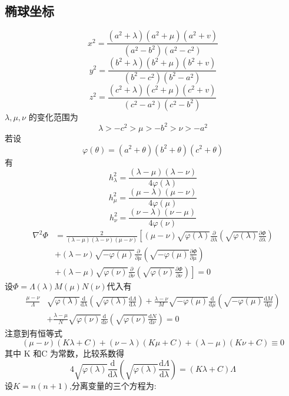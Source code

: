\documentclass[a4paper]{ctexart}
\begin{document}
\subsection{椭球坐标}
\[
    x^{2}=\frac{\left(a^{2}+\lambda\right)\left(a^{2}+\mu\right)\left(a^{2}+v\right)}{\left(a^{2}-b^{2}\right)\left(a^{2}-c^{2}\right)}
\]
\[
    y^{2}=\frac{\left(b^{2}+\lambda\right)\left(b^{2}+\mu\right)\left(b^{2}+v\right)}{\left(b^{2}-c^{2}\right)\left(b^{2}-a^{2}\right)}
\]
\[
    z^{2}=\frac{\left(c^{2}+\lambda\right)\left(c^{2}+\mu\right)\left(c^{2}+v\right)}{\left(c^{2}-a^{2}\right)\left(c^{2}-b^{2}\right)}
\]
$\lambda, \mu, \nu$ 的变化范围为
\[
    \lambda>-c^{2}>\mu>-b^{2}>\nu>-a^{2}
\]
若设
\[
    \varphi(\theta)=\left(a^{2}+\theta\right)\left(b^{2}+\theta\right)\left(c^{2}+\theta\right)
\]
有
\[
    h_{\lambda}^{2}=\frac{(\lambda-\mu)(\lambda-\nu)}{4 \varphi(\lambda)}
\]
\[
    h_{\mu}^{2}=\frac{(\mu-\lambda)(\mu-\nu)}{4 \varphi(\mu)}
\]
\[
    h_{\nu}^{2}=\frac{(\nu-\lambda)(\nu-\mu)}{4 \varphi(\nu)}
\]
\[
    \begin{aligned}
        \nabla^{2} \Phi
         & =\frac{2}{(\lambda-\mu)(\lambda-\nu)(\mu-\nu)}\left[(\mu-\nu) \sqrt{\varphi(\lambda)} \frac{\partial}{\partial \lambda}\left(\sqrt{\varphi(\lambda)} \frac{\partial \Phi}{\partial \lambda}\right)\right. \\
         & +(\lambda-\nu) \sqrt{-\varphi(\mu)} \frac{\partial}{\partial \mu}\left(\sqrt{-\varphi(\mu)} \frac{\partial \Phi}{\partial \mu}\right)                                                                     \\
         & +\left.(\lambda-\mu) \sqrt{\varphi(\nu)} \frac{\partial}{\partial \nu}\left(\sqrt{\varphi(\nu)} \frac{\partial \Phi}{\partial \nu}\right)\right]=0
    \end{aligned}
\]
设$\Phi=\Lambda(\lambda) M(\mu) N(\nu)$代入有
\[
    \begin{aligned}
        \frac{\mu-\nu}{\Lambda}
         & \sqrt{\varphi(\lambda)} \frac{\mathrm{d}}{\mathrm{d} \lambda}\left(\sqrt{\varphi(\lambda)} \frac{\mathrm{d} \Lambda}{\mathrm{d} \lambda}\right)+\frac{\lambda-\nu}{M} \sqrt{-\varphi(\mu)} \frac{\mathrm{d}}{\mathrm{d} \mu}\left(\sqrt{-\varphi(\mu)} \frac{\mathrm{d} M}{\mathrm{d} \mu}\right) \\
         & +\frac{\lambda-\mu}{N} \sqrt{\varphi(\nu)} \frac{\mathrm{d}}{\mathrm{d} \nu}\left(\sqrt{\varphi(\nu)} \frac{\mathrm{d} N}{\mathrm{d} \nu}\right)=0
    \end{aligned}
\]
注意到有恒等式
\[
    (\mu-\nu)(K \lambda+C)+(\nu-\lambda)(K \mu+C)+(\lambda-\mu)(K \nu+C) \equiv 0
\]
其中 K 和C 为常数，比较系数得
\[
    4 \sqrt{\varphi(\lambda)} \frac{\mathrm{d}}{\mathrm{d} \lambda}\left(\sqrt{\varphi(\lambda)} \frac{\mathrm{d} \Lambda}{\mathrm{d} \lambda}\right)=(K \lambda+C) \Lambda
\]
设$K=n(n+1)$,分离变量的三个方程为:
\end{document}
